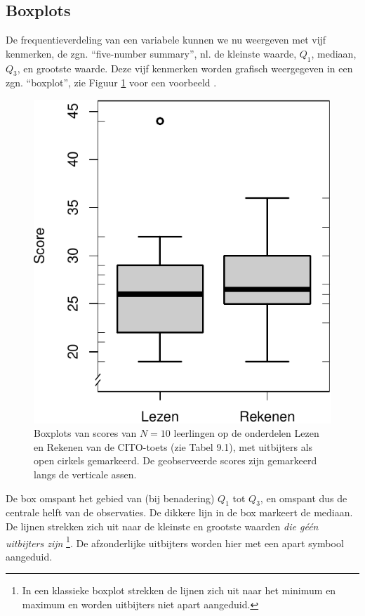 \documentclass[
]{book}
\begin{document}
\hypertarget{sec:boxplot}{%
\subsection{Boxplots}\label{sec:boxplot}}

De frequentieverdeling van een variabele kunnen we nu weergeven met vijf
kenmerken, de zgn. ``five-number summary'', nl. de kleinste waarde, \(Q_1\),
mediaan, \(Q_3\), en grootste waarde. Deze vijf kenmerken worden grafisch
weergegeven in een zgn. ``boxplot'', zie
Figuur \ref{fig:cito-boxplot} voor een voorbeeld \citep[ §2C]{Tukey77}.

\begin{figure}
\centering
\includegraphics{MS1NL-boek_files/figure-latex/cito-boxplot-1.pdf}
\caption{\label{fig:cito-boxplot}Boxplots van scores van \(N=10\) leerlingen op de onderdelen Lezen en Rekenen van de CITO-toets (zie Tabel 9.1), met uitbijters als open cirkels gemarkeerd. De geobserveerde scores zijn gemarkeerd langs de verticale assen.}
\end{figure}

De box omspant het gebied van (bij benadering) \(Q_1\) tot \(Q_3\), en
omspant dus de centrale helft van de observaties. De dikkere lijn in de
box markeert de mediaan. De lijnen strekken zich uit naar de kleinste en
grootste waarden \emph{die géén uitbijters zijn} \footnote{In een klassieke boxplot strekken de lijnen zich uit naar het minimum en maximum \citep{Tukey77} en worden uitbijters niet apart aangeduid.}. De afzonderlijke
uitbijters worden hier met een apart symbool aangeduid.
\end{document}

